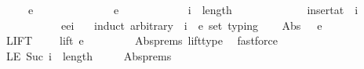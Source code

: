 \begin{isabellebody}
\ \ \ {\isachardoublequoteopen}{\isasymGamma}{}\ {\isasymturnstile}\ e{}\ {\isacharcolon}{\kern0pt}\ {\isasymtau}{}\ {\isasymLongrightarrow}\isanewline
\ \ \ \ \ \ \ \ \ {\isasymGamma}{}\ {\isasymturnstile}\ e{}\ {\isacharcolon}{\kern0pt}\ {\isasymtau}{}\ {\isasymLongrightarrow}\isanewline
\ \ \ \ \ \ \ \ \ i\ {\isasymle}\ length\ {\isasymGamma}{}\ {\isasymLongrightarrow}\isanewline
\ \ \ \ \ \ \ \ \ {\isasymGamma}{}\ {\isacharequal}{\kern0pt}\ insert{\isacharunderscore}{\kern0pt}at\ {\isasymGamma}{}\ i\ {\isasymtau}{}\ {\isasymLongrightarrow}\isanewline
\ \ \ \ \ \ \ \ \ {\isasymGamma}{}\ {\isasymturnstile}\ e{}{\isacharbrackleft}{\kern0pt}e{}{\isacharslash}{\kern0pt}i{\isacharbrackright}{\kern0pt}\ {\isacharcolon}{\kern0pt}\ {\isasymtau}{}{\isachardoublequoteclose}\isanewline
%
\isadelimproof
%
\endisadelimproof
%
\isatagproof
{}\isamarkupfalse%
\ {\isacharparenleft}{\kern0pt}induct\ arbitrary{\isacharcolon}{\kern0pt}\ {\isasymGamma}{}\ i\ {\isasymtau}{}\ e{}\ set{\isacharcolon}{\kern0pt}\ typing{\isacharparenright}{\kern0pt}\isanewline
\ \ \isamarkupfalse%
\ {\isacharparenleft}{\kern0pt}Abs\ {\isasymtau}{}{\isacharprime}{\kern0pt}\ {\isasymGamma}{\isacharprime}{\kern0pt}\ e{\isacharprime}{\kern0pt}\ {\isasymtau}{}{\isacharprime}{\kern0pt}{\isacharparenright}{\kern0pt}\isanewline
\ \ \isamarkupfalse%
\ LIFT{\isacharcolon}{\kern0pt}\ {\isachardoublequoteopen}{\isasymtau}{}{\isacharprime}{\kern0pt}\ {\isacharhash}{\kern0pt}\ {\isasymGamma}{}\ {\isasymturnstile}\ lift\ e{}\ {}\ {\isacharcolon}{\kern0pt}\ {\isasymtau}{}{\isachardoublequoteclose}\isanewline
\ \ \ \ \isamarkupfalse%
\ Abs{\isachardot}{\kern0pt}prems{\isacharparenleft}{\kern0pt}{}{\isacharparenright}{\kern0pt}\ lift{\isacharunderscore}{\kern0pt}type\ \isamarkupfalse%
\ fastforce\isanewline
\ \ \isamarkupfalse%
\ LE{\isacharcolon}{\kern0pt}\ {\isachardoublequoteopen}Suc\ i\ {\isasymle}\ length\ {\isacharparenleft}{\kern0pt}{\isasymtau}{}{\isacharprime}{\kern0pt}\ {\isacharhash}{\kern0pt}\ {\isasymGamma}{}{\isacharparenright}{\kern0pt}{\isachardoublequoteclose}\ \isamarkupfalse%
\ Abs{\isachardot}{\kern0pt}prems{\isacharparenleft}{\kern0pt}{}{\isacharparenright}{\kern0pt}\ \isamarkupfalse%

\end{isabellebody}
